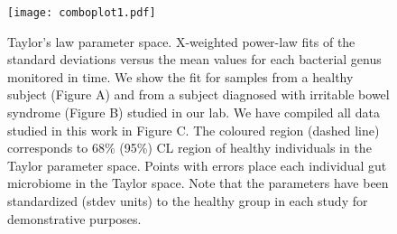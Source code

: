 \documentclass[12pt]{article}
\begin{document}
\begin{figure}[!ht]
\texttt{[image: comboplot1.pdf]}
\caption{Taylor's law parameter space. X-weighted power-law fits of the standard deviations versus the mean values for each bacterial genus monitored in time. We show the fit for samples from a healthy subject (Figure A) and from a subject diagnosed with irritable bowel syndrome (Figure B) studied in our lab\cite{durban}. We have compiled all data studied in this work in Figure C. The coloured region (dashed line) corresponds to 68\% (95\%) CL region of healthy individuals in the Taylor parameter space. Points with errors place each individual gut microbiome in the Taylor space. Note that the parameters have been standardized (stdev units) to the healthy group in each study for demonstrative purposes.}
\end{figure}
\end{document}

